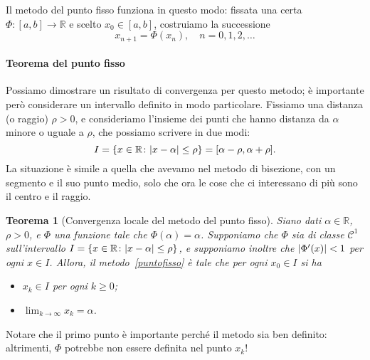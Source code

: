 \documentclass[a4paper]{report}
\DeclarePairedDelimiter{\abs}{\lvert}{\rvert}
\newtheorem{theorem}{Teorema}[chapter]
\theoremstyle{definiton}
\theoremstyle{remark}
\begin{document}
Il metodo del punto fisso funziona in questo modo: fissata una certa $\Phi:[a,b] \to \mathbb{R}$ e scelto $x_0 \in [a,b]$, costruiamo la successione
\begin{equation} \label{puntofisso}
    x_{n+1} = \Phi(x_n), \quad n=0,1,2,\dots    
\end{equation}

\paragraph{Teorema del punto fisso} Possiamo dimostrare un risultato di convergenza per questo metodo; è importante però considerare un intervallo definito in modo particolare. Fissiamo una distanza (o raggio) $\rho>0$, e consideriamo l'insieme dei punti che hanno distanza da $\alpha$ minore o uguale a $\rho$, che possiamo scrivere in due modi:
\[
    I = \{x\in\mathbb{R} \colon \abs{x-\alpha} \leq \rho\} = [\alpha-\rho, \alpha + \rho].
\]
La situazione è simile a quella che avevamo nel metodo di bisezione, con un segmento e il suo punto medio, solo che ora le cose che ci interessano di più sono il centro e il raggio.

\begin{center}
\end{center}


\begin{theorem}[Convergenza locale del metodo del punto fisso]\label{thm:puntofisso}
Siano dati $\alpha\in\mathbb{R}$, $\rho>0$, e $\Phi$ una funzione tale che $\Phi(\alpha)=\alpha$. Supponiamo che $\Phi$ sia di classe $\mathcal{C}^1$ sull'intervallo $I = \{x\in\mathbb{R} \colon \abs{x-\alpha} \leq \rho\}$, e supponiamo inoltre che $\abs{\Phi'(x)}<1$ per ogni $x\in I$. Allora, il metodo~\eqref{puntofisso} è tale che per ogni $x_0 \in I$ si ha
\begin{itemize}
    \item $x_k \in I$ per ogni $k \geq 0$;
    \item $\lim_{k\to\infty} x_k = \alpha$.
\end{itemize}
\end{theorem}
Notare che il primo punto è importante perché il metodo sia ben definito: altrimenti, $\Phi$ potrebbe non essere definita nel punto $x_k$!
\end{document}
